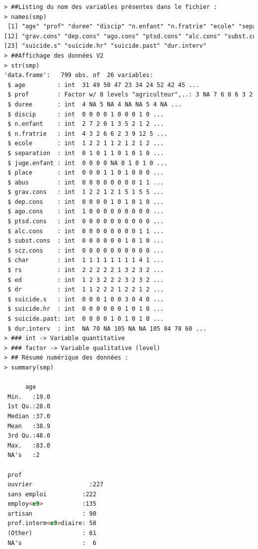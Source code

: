 \begin{lstlisting}[language=html]
> ##Listing du nom des variables présentes dans le fichier :
> names(smp)
 [1] "age" "prof" "duree" "discip" "n.enfant" "n.fratrie" "ecole" "separation" "juge.enfant"  "place" "abus"        
[12] "grav.cons" "dep.cons" "ago.cons" "ptsd.cons" "alc.cons" "subst.cons" "scz.cons" "char" "rs" "ed" "dr"          
[23] "suicide.s" "suicide.hr" "suicide.past" "dur.interv"  
> ##Affichage des données V2
> str(smp)
'data.frame':	799 obs. of  26 variables:
 $ age         : int  31 49 50 47 23 34 24 52 42 45 ...
 $ prof        : Factor w/ 8 levels "agriculteur",..: 3 NA 7 6 8 6 3 2 6 6 ...
 $ duree       : int  4 NA 5 NA 4 NA NA 5 4 NA ...
 $ discip      : int  0 0 0 0 1 0 0 0 1 0 ...
 $ n.enfant    : int  2 7 2 0 1 3 5 2 1 2 ...
 $ n.fratrie   : int  4 3 2 6 6 2 3 9 12 5 ...
 $ ecole       : int  1 2 2 1 1 2 1 2 1 2 ...
 $ separation  : int  0 1 0 1 1 0 1 0 1 0 ...
 $ juge.enfant : int  0 0 0 0 NA 0 1 0 1 0 ...
 $ place       : int  0 0 0 1 1 0 1 0 0 0 ...
 $ abus        : int  0 0 0 0 0 0 0 0 1 1 ...
 $ grav.cons   : int  1 2 2 1 2 1 5 1 5 5 ...
 $ dep.cons    : int  0 0 0 0 1 0 1 0 1 0 ...
 $ ago.cons    : int  1 0 0 0 0 0 0 0 0 0 ...
 $ ptsd.cons   : int  0 0 0 0 0 0 0 0 0 0 ...
 $ alc.cons    : int  0 0 0 0 0 0 0 0 1 1 ...
 $ subst.cons  : int  0 0 0 0 0 0 1 0 1 0 ...
 $ scz.cons    : int  0 0 0 0 0 0 0 0 0 0 ...
 $ char        : int  1 1 1 1 1 1 1 1 4 1 ...
 $ rs          : int  2 2 2 2 2 1 3 2 3 2 ...
 $ ed          : int  1 2 3 2 2 2 3 2 3 2 ...
 $ dr          : int  1 1 2 2 2 1 2 2 1 2 ...
 $ suicide.s   : int  0 0 0 1 0 0 3 0 4 0 ...
 $ suicide.hr  : int  0 0 0 0 0 0 1 0 1 0 ...
 $ suicide.past: int  0 0 0 0 1 0 1 0 1 0 ...
 $ dur.interv  : int  NA 70 NA 105 NA NA 105 84 78 60 ...
> ### int -> Variable quantitative
> ### factor -> Variable qualitative (level)
> ## Résumé numérique des données :
> summary(smp)

      age   		
 Min.   :19.0 	 
 1st Qu.:28.0 
 Median :37.0
 Mean   :38.9
 3rd Qu.:48.0 
 Max.   :83.0 
 NA's   :2  
 
 prof     
 ouvrier   		        :227 
 sans emploi          :222
 employ<e9>           :135 
 artisan              : 90
 prof.interm<e9>diaire: 58 
 (Other)              : 61 
 NA's                 :  6 
 

\end{lstlisting}
